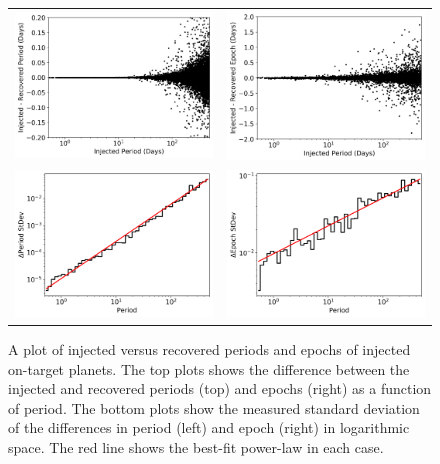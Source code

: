 \begin{figure}[ht]
\centering
\begin{tabular}{cc}
\includegraphics[width=0.5\linewidth]{INJ1-Ephem-Recovery-1.png} &
\includegraphics[width=0.5\linewidth]{INJ1-Ephem-Recovery-2.png} \\
\includegraphics[width=0.5\linewidth]{INJ1-Ephem-Recovery-3.png} &
\includegraphics[width=0.5\linewidth]{INJ1-Ephem-Recovery-4.png}
\end{tabular}
\caption{A plot of injected versus recovered periods and epochs of injected on-target planets. The top plots shows the difference between the injected and recovered periods (top) and epochs (right) as a function of period. The bottom plots show the measured standard deviation of the differences in period (left) and epoch (right) in logarithmic space. The red line shows the best-fit power-law in each case.}
\label{injephemfig}
\end{figure}


